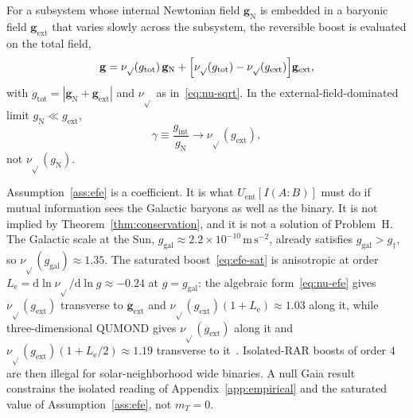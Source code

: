 \begin{assumption}
  \label{ass:efe}
  For a subsystem whose internal Newtonian field
  \(\mathbf{g}_{\mathrm{N}}\) is embedded in a baryonic field
  \(\mathbf{g}_{\mathrm{ext}}\) that varies slowly across the
  subsystem, the reversible boost is evaluated on the total
  field,
  \begin{equation}
    \label{eq:nu-efe}
    \mathbf{g}
    =\nu_{\sqrt{}}(g_{\mathrm{tot}})\,\mathbf{g}_{\mathrm{N}}
     +\Bigl[\nu_{\sqrt{}}(g_{\mathrm{tot}})
            -\nu_{\sqrt{}}(g_{\mathrm{ext}})\Bigr]
      \mathbf{g}_{\mathrm{ext}},
  \end{equation}
  with \(g_{\mathrm{tot}}=|\mathbf{g}_{\mathrm{N}}+\mathbf{g}_{\mathrm{ext}}|\)
  and \(\nu_{\sqrt{}}\) as in~\eqref{eq:nu-sqrt}.
  In the external-field-dominated limit
  \(g_{\mathrm{N}}\ll g_{\mathrm{ext}}\),
  \begin{equation}
    \label{eq:efe-sat}
    \gamma
    \equiv\frac{g_{\mathrm{int}}}{g_{\mathrm{N}}}
    \to\nu_{\sqrt{}}(g_{\mathrm{ext}}),
  \end{equation}
  not \(\nu_{\sqrt{}}(g_{\mathrm{N}})\).
\end{assumption}

Assumption~\ref{ass:efe} is a coefficient. It is what
\(U_{\mathrm{ent}}[I(A:B)]\) must do if mutual information
sees the Galactic baryons as well as the binary. It is not
implied by Theorem~\ref{thm:conservation}, and it is not a
solution of Problem~H. The Galactic scale at the Sun,
\(g_{\mathrm{gal}}\approx 2.2\times 10^{-10}\,\mathrm{m\,s^{-2}}\),
already satisfies \(g_{\mathrm{gal}}>g_\dagger\), so
\(\nu_{\sqrt{}}(g_{\mathrm{gal}})\approx 1.35\). The saturated boost~\eqref{eq:efe-sat}
is anisotropic at order
\(L_{\mathrm{e}}=\mathrm{d}\ln\nu_{\sqrt{}}/\mathrm{d}\ln g\approx -0.24\)
at \(g=g_{\mathrm{gal}}\): the algebraic form~\eqref{eq:nu-efe} gives
\(\nu_{\sqrt{}}(g_{\mathrm{ext}})\) transverse to
\(\mathbf{g}_{\mathrm{ext}}\) and
\(\nu_{\sqrt{}}(g_{\mathrm{ext}})(1+L_{\mathrm{e}})\approx 1.03\) along it,
while three-dimensional QUMOND gives \(\nu_{\sqrt{}}(g_{\mathrm{ext}})\)
along it and \(\nu_{\sqrt{}}(g_{\mathrm{ext}})(1+L_{\mathrm{e}}/2)\approx 1.19\)
transverse to it~\cite{FamaeyMcGaugh2012}. Isolated-RAR
boosts of order \(4\) are then illegal for solar-neighborhood
wide binaries. A null Gaia result constrains the isolated
reading of Appendix~\ref{app:empirical} and the saturated value
of Assumption~\ref{ass:efe}, not \(m_T=0\).


